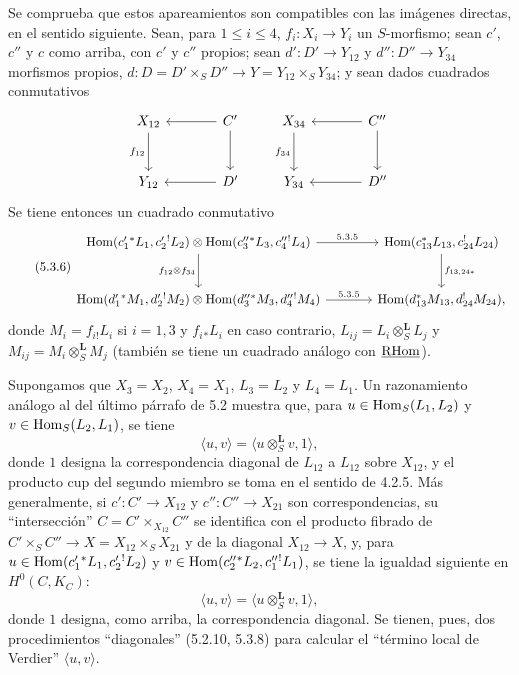 Se comprueba que estos apareamientos son compatibles con las imágenes directas, en el sentido siguiente. Sean, para $1\leq i\leq4$, $f_i:X_i\to Y_i$ un $S$-morfismo; sean $c'$, $c''$ y $c$ como arriba, con $c'$ y $c''$ propios; sean $d':D'\to Y_{12}$ y $d'':D''\to Y_{34}$ morfismos propios, $d:D=D'\times_SD''\to Y=Y_{12}\times_SY_{34}$; y sean dados cuadrados conmutativos
\[
\begin{tikzcd}[column sep=large,row sep=large]
X_{12} \arrow[d,"f_{12}"'] & C' \arrow[l] \arrow[d] \\
Y_{12} & D' \arrow[l]
\end{tikzcd}
\qquad
\begin{tikzcd}[column sep=large,row sep=large]
X_{34} \arrow[d,"f_{34}"'] & C'' \arrow[l] \arrow[d] \\
Y_{34} & D'' \arrow[l]
\end{tikzcd}
\]
Se tiene entonces un cuadrado conmutativo
\begin{equation}
\tag{5.3.6}
\begin{tikzcd}[column sep=large,row sep=large]
\Hom(c_1'{}^*L_1,c_2'{}^!L_2)\otimes\Hom(c_3''{}^*L_3,c_4''{}^!L_4) \arrow[r,"5.3.5"] \arrow[d,"f_{12}\otimes f_{34}"']
& \Hom(c_{13}^*L_{13},c_{24}^!L_{24}) \arrow[d,"f_{13,24*}"] \\
\Hom(d_1'{}^*M_1,d_2'{}^!M_2)\otimes\Hom(d_3''{}^*M_3,d_4''{}^!M_4) \arrow[r,"5.3.5"]
& \Hom(d_{13}^*M_{13},d_{24}^!M_{24}),
\end{tikzcd}
\end{equation}
donde $M_i=f_{i!}L_i$ si $i=1,3$ y $f_i{}_*L_i$ en caso contrario, $L_{ij}=L_i\otimes_S^{\mathbf L}L_j$ y $M_{ij}=M_i\otimes_S^{\mathbf L}M_j$ (también se tiene un cuadrado análogo con $\underline{\mathrm{RHom}}$).

Supongamos que $X_3=X_2$, $X_4=X_1$, $L_3=L_2$ y $L_4=L_1$. Un razonamiento análogo al del último párrafo de 5.2 muestra que, para $u\in\operatorname{Hom}_S(L_1,L_2)$ y $v\in\operatorname{Hom}_S(L_2,L_1)$, se tiene
\begin{equation}
\tag{5.3.7}
\langle u,v\rangle=\langle u\otimes_S^{\mathbf L}v,1\rangle,
\end{equation}
donde $1$ designa la correspondencia diagonal de $L_{12}$ a $L_{12}$ sobre $X_{12}$, y el producto cup del segundo miembro se toma en el sentido de 4.2.5. Más generalmente, si $c':C'\to X_{12}$ y $c'':C''\to X_{21}$ son correspondencias, su ``intersección'' $C=C'\times_{X_{12}}C''$ se identifica con el producto fibrado de $C'\times_SC''\to X=X_{12}\times_SX_{21}$ y de la diagonal $X_{12}\to X$, y, para $u\in\operatorname{Hom}(c_1'{}^*L_1,c_2'{}^!L_2)$ y $v\in\operatorname{Hom}(c_2''{}^*L_2,c_1''{}^!L_1)$, se tiene la igualdad siguiente en $H^0(C,K_C)$:
\begin{equation}
\tag{5.3.8}
\langle u,v\rangle=\langle u\otimes_S^{\mathbf L}v,1\rangle,
\end{equation}
donde $1$ designa, como arriba, la correspondencia diagonal. Se tienen, pues, dos procedimientos ``diagonales'' (5.2.10, 5.3.8) para calcular el ``término local de Verdier'' $\langle u,v\rangle$.

